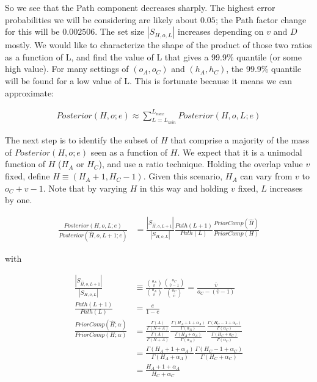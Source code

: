 \documentclass{article}
\begin{document}
So we see that the Path component decreases sharply.  The highest
error probabilities we will be considering are likely about $0.05$;
the Path factor change for this will be $0.002506$. The set size
$|S_{H,o,L}|$ increases depending on $v$ and $D$ mostly. We would like
to characterize the shape of the product of those two ratios as a
function of L, and find the value of L that gives a 99.9\% quantile
(or some high value).  For many settings of $(o_A, o_C)$ and $(h_A,
h_C)$, the 99.9\% quantile will be found for a low value of L.  This
is fortunate because it means we can approximate:

\begin{align}
  Posterior(H,o;e) \approx \sum_{L=L_{min}}^{L_{max}} Posterior(H,o,L;e)
\end{align}

The next step is to identify the subset of $H$ that comprise a
majority of the mass of $Posterior(H,o;e)$ seen as a function of
$H$. We expect that it is a unimodal function of $H$ ($H_A$ or $H_C$),
and use a ratio technique.  Holding the overlap value $v$ fixed,
define $\hat{H} \equiv (H_A + 1, H_C -1)$.  Given this scenario, $H_A$
can vary from $v$ to $o_C + v - 1$. Note that by varying $H$ in this
way and holding $v$ fixed, $L$ increases by one.

\begin{align}
  \frac{Posterior(H,o,L;e)}{Posterior(\hat{H},o,L+1;e)} & =
  \frac{|S_{\hat{H},o,L+1}|}{|S_{H,o,L}|}
  \frac{Path(L+1)}{Path(L)}
  \frac{PriorComp(\hat{H})}{PriorComp(H)} \nonumber  
\end{align}

with

\begin{align}
  \frac{|S_{\hat{H},o,L+1}|}{|S_{H,o,L}|}
  & \equiv
  \frac{{o_A \choose v}}{{o_A \choose v}}
  \frac{{o_C \choose {\bar{v}-1}}}{{o_C \choose \bar{v}}}
  =
  \frac{\bar{v}}{o_C - (\bar{v} - 1)} \\[3ex]
  \frac{Path(L+1)}{Path(L)}
  & =
  \frac{e}{1 - e} \\[3ex]
  \frac{PriorComp(\hat{H};\alpha)}{PriorComp(H;\alpha)} & =
  \frac{\frac{\Gamma(A)}{\Gamma(N+A)}}{\frac{\Gamma(A)}{\Gamma(N+A)}}
  \frac{ \frac{\Gamma(H_A+1+\alpha_A)}{\Gamma(\alpha_A)}}{
    \frac{\Gamma(H_A+\alpha_A)}{\Gamma(\alpha_A)} } \frac{
    \frac{\Gamma(H_C-1+\alpha_C)}{\Gamma(\alpha_C)} }{
    \frac{\Gamma(H_C+\alpha_C)}{\Gamma(\alpha_C)} } \nonumber \\[2ex]
  & =
  \frac{\Gamma(H_A + 1 + \alpha_A)}{\Gamma(H_A + \alpha_A)}
  \frac{\Gamma(H_C - 1 + \alpha_C)}{\Gamma(H_C + \alpha_C)} \nonumber \\[2ex]
  & =
  \frac{H_A + 1 + \alpha_A}{H_C + \alpha_C}
\end{align}
\end{document}
